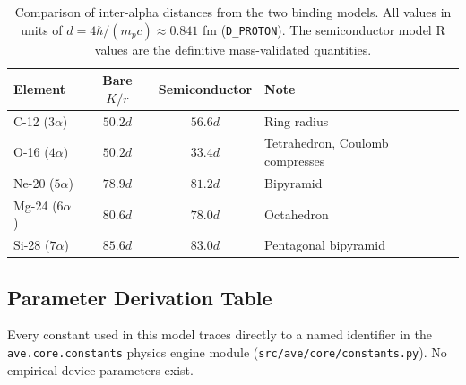 \begin{table}[htbp]
\centering
\caption{Comparison of inter-alpha distances from the two binding models. All values in units of $d = 4\hbar/(m_p c) \approx 0.841$ fm (\texttt{D\_PROTON}). The semiconductor model R values are the definitive mass-validated quantities.}
\label{tab:model_comparison}
\begin{tabular}{l c c l}
\hline
\textbf{Element} & \textbf{Bare $K/r$} & \textbf{Semiconductor} & \textbf{Note} \\
\hline
C-12 ($3\alpha$) & $50.2d$ & $56.6d$ & Ring radius \\
O-16 ($4\alpha$) & $50.2d$ & $33.4d$ & Tetrahedron, Coulomb compresses \\
Ne-20 ($5\alpha$) & $78.9d$ & $81.2d$ & Bipyramid \\
Mg-24 ($6\alpha$) & $80.6d$ & $78.0d$ & Octahedron \\
Si-28 ($7\alpha$) & $85.6d$ & $83.0d$ & Pentagonal bipyramid \\
\hline
\end{tabular}
\end{table}

\subsection{Parameter Derivation Table}

Every constant used in this model traces directly to a named identifier in the \texttt{ave.core.constants} physics engine module (\texttt{src/ave/core/constants.py}). No empirical device parameters exist.

